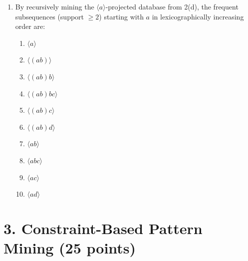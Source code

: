 \documentclass[12pt]{article}
\begin{document}
\begin{enumerate}[label=(\alph*)]
    \vspace{2em}
    
    \item
    By recursively mining the $\langle a \rangle$-projected database from 2(d), the frequent subsequences (support $\ge 2$) starting with $a$ in lexicographically increasing order are:
    \begin{enumerate}
        \item $\langle a \rangle$
        \item $\langle (ab) \rangle$
        \item $\langle (ab)b \rangle$
        \item $\langle (ab)bc \rangle$
        \item $\langle (ab)c \rangle$
        \item $\langle (ab)d \rangle$
        \item $\langle ab \rangle$
        \item $\langle abc \rangle$
        \item $\langle ac \rangle$
        \item $\langle ad \rangle$
    \end{enumerate}
    
    
\end{enumerate}

\newpage
\section*{3. Constraint-Based Pattern Mining (25 points)}
\end{document}
